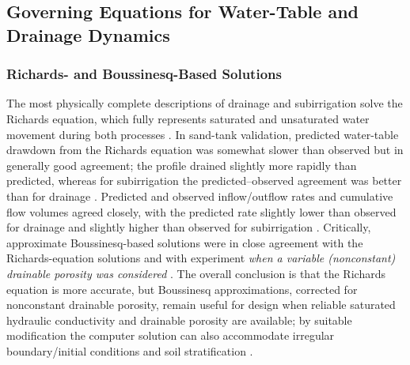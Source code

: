\subsection{Governing Equations for Water-Table and Drainage Dynamics}

\subsubsection{Richards- and Boussinesq-Based Solutions}

The most physically complete descriptions of drainage and subirrigation solve the
Richards equation, which fully represents saturated and unsaturated water movement during
both processes \parencite{TANG1977}. In sand-tank validation, predicted water-table
drawdown from the Richards equation was somewhat slower than observed but in generally
good agreement; the profile drained slightly more rapidly than predicted, whereas for
subirrigation the predicted--observed agreement was better than for drainage
\parencite{TANG1977}. Predicted and observed inflow/outflow rates and cumulative flow
volumes agreed closely, with the predicted rate slightly lower than observed for drainage
and slightly higher than observed for subirrigation \parencite{TANG1977}. Critically,
approximate Boussinesq-based solutions were in close agreement with the Richards-equation
solutions and with experiment \emph{when a variable (nonconstant) drainable porosity was
considered} \parencite{TANG1977}. The overall conclusion is that the Richards equation is
more accurate, but Boussinesq approximations, corrected for nonconstant drainable
porosity, remain useful for design when reliable saturated hydraulic conductivity and
drainable porosity are available; by suitable modification the computer solution can also
accommodate irregular boundary/initial conditions and soil stratification
\parencite{TANG1977}.


